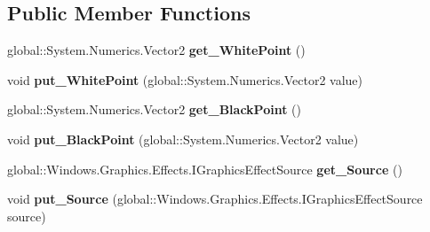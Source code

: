 \subsection*{Public Member Functions}
\begin{DoxyCompactItemize}
\item 
\mbox{\label{interface_microsoft_1_1_graphics_1_1_canvas_1_1_effects_1_1_i_brightness_effect_aa13686f2b0df81d7724f03c2c649a547}} 
global\+::\+System.\+Numerics.\+Vector2 {\bfseries get\+\_\+\+White\+Point} ()
\item 
\mbox{\label{interface_microsoft_1_1_graphics_1_1_canvas_1_1_effects_1_1_i_brightness_effect_a780cd9cb83886a938f8c75d0b98e66ab}} 
void {\bfseries put\+\_\+\+White\+Point} (global\+::\+System.\+Numerics.\+Vector2 value)
\item 
\mbox{\label{interface_microsoft_1_1_graphics_1_1_canvas_1_1_effects_1_1_i_brightness_effect_a6be901641809645b761096514be45de6}} 
global\+::\+System.\+Numerics.\+Vector2 {\bfseries get\+\_\+\+Black\+Point} ()
\item 
\mbox{\label{interface_microsoft_1_1_graphics_1_1_canvas_1_1_effects_1_1_i_brightness_effect_afe239defd7c9c83a318e6b02fae24e20}} 
void {\bfseries put\+\_\+\+Black\+Point} (global\+::\+System.\+Numerics.\+Vector2 value)
\item 
\mbox{\label{interface_microsoft_1_1_graphics_1_1_canvas_1_1_effects_1_1_i_brightness_effect_abf9e5eb7f7c91f123aa441a7dd92ada3}} 
global\+::\+Windows.\+Graphics.\+Effects.\+I\+Graphics\+Effect\+Source {\bfseries get\+\_\+\+Source} ()
\item 
\mbox{\label{interface_microsoft_1_1_graphics_1_1_canvas_1_1_effects_1_1_i_brightness_effect_a30f90f5f327a749696e5c3766535368e}} 
void {\bfseries put\+\_\+\+Source} (global\+::\+Windows.\+Graphics.\+Effects.\+I\+Graphics\+Effect\+Source source)

\end{DoxyCompactItemize}
